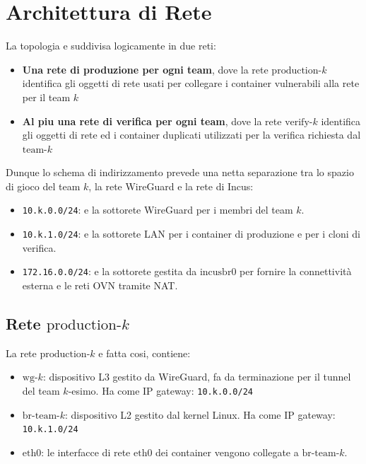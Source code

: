 \section{Architettura di Rete}\label{architettura-di-rete}

La topologia e\textquotesingle{} suddivisa logicamente in due reti:

\begin{itemize}
\tightlist
\item
  \textbf{Una rete di produzione per ogni team}, dove la rete
  \(\text{production-}k\) identifica gli oggetti di rete usati per
  collegare i container vulnerabili alla rete per il team \(k\)
\item
  \textbf{Al piu\textquotesingle{} una rete di verifica per ogni team},
  dove la rete \(\text{verify-}k\) identifica gli oggetti di rete ed i
  container duplicati utilizzati per la verifica richiesta dal
  \(\text{team-}k\)
\end{itemize}

Dunque lo schema di indirizzamento prevede una netta separazione tra lo
spazio di gioco del team \(k\), la rete WireGuard e la rete di Incus:

\begin{itemize}
\tightlist
\item
  \passthrough{\lstinline!10.k.0.0/24!}: e\textquotesingle{} la
  sottorete WireGuard per i membri del team \(k\).
\item
  \passthrough{\lstinline!10.k.1.0/24!}: e\textquotesingle{} la
  sottorete LAN per i container di produzione e per i cloni di verifica.
\item
  \passthrough{\lstinline!172.16.0.0/24!}: e\textquotesingle{} la
  sottorete gestita da \(\text{incusbr0}\) per fornire la connettività
  esterna e le reti OVN tramite NAT.
\end{itemize}

\subsection{\texorpdfstring{Rete
\(\text{production-}k\)}{Rete \textbackslash text\{production-\}k}}\label{rete-textproduction-k}

La rete \(\text{production-}k\) e\textquotesingle{} fatta cosi,
contiene:

\begin{itemize}
\tightlist
\item
  \(\text{wg-}k\): dispositivo L3 gestito da WireGuard, fa da
  terminazione per il tunnel del team \(k\)-esimo. Ha come IP gateway:
  \passthrough{\lstinline!10.k.0.0/24!}
\item
  \(\text{br-team-}k\): dispositivo L2 gestito dal kernel Linux. Ha come
  IP gateway: \passthrough{\lstinline!10.k.1.0/24!}
\item
  \(\text{eth0}\): le interfacce di rete \(\text{eth0}\) dei container
  vengono collegate a \(\text{br-team-}k\).
\end{itemize}

